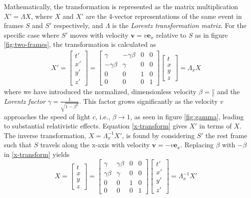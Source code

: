 \documentclass[a4paper]{article}
\begin{document}
Mathematically, the transformation is represented as the matrix multiplication $X' = \Lambda X$, where $X$ and $X'$ are the 4-vector representations of the same event in frames $S$ and $S'$ respectively, and $\Lambda$ is the \textit{Lorentz transformation matrix}. For the specific case where $S'$ moves with velocity $\mathbf{v} = v\mathbf{e}_x$ relative to $S$ as in figure \ref{fig:two-frames}, the transformation is calculated as
\begin{align}
    \label{x-transform}
    X' = \begin{bmatrix}
        t'\\ x' \\ y' \\z'
    \end{bmatrix} = \begin{bmatrix}
        \gamma & -\gamma \beta & 0 & 0 \\
        -\gamma \beta & \gamma & 0 & 0 \\
        0 & 0 & 1 & 0 \\
        0 & 0 & 0 & 1 
    \end{bmatrix} \begin{bmatrix}
        t \\ x \\ y \\ z
    \end{bmatrix} = \Lambda_x X
\end{align}
where we have introduced the normalized, dimensionless velocity $\beta=\frac{v}{c}$ and the \textit{Lorentz factor} $\gamma = \frac{1}{\sqrt{ 1-\beta^{2} }}$. This factor grows significantly as the velocity $v$ approaches the speed of light $c$, i.e., $\beta \to 1$, as seen in figure \ref{fig:gamma}, leading to substantial relativistic effects.
Equation \eqref{x-transform} gives $X'$ in terms of $X$. The inverse transformation, $X = \Lambda_x^{-1} X'$, is found by considering $S'$ the rest frame such that $S$ travels along the x-axis with velocity $\mathbf{v} = -v\mathbf{e}_x$. Replacing $\beta$ with $-\beta$ in \eqref{x-transform} yields
\begin{equation} \label{inversetransform}
    X = \begin{bmatrix}
        t \\ x \\ y \\ z
    \end{bmatrix} = \begin{bmatrix}
        \gamma & \gamma \beta & 0 & 0 \\
        \gamma \beta & \gamma & 0 & 0 \\
        0 & 0 & 1 & 0 \\
        0 & 0 & 0 & 1 
    \end{bmatrix} \begin{bmatrix}
        t' \\ x' \\ y' \\ z'
    \end{bmatrix} = \Lambda_x^{-1} X'
\end{equation}
\end{document}
